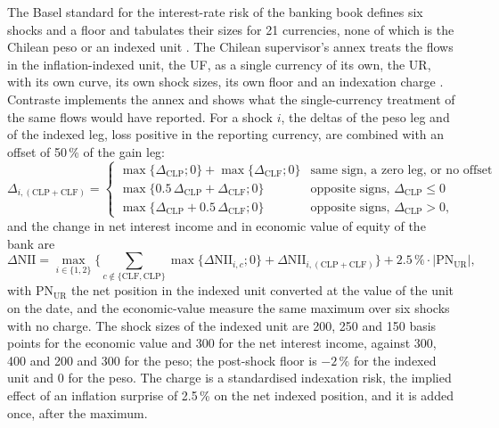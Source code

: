 The Basel standard for the interest-rate risk of the banking book defines six shocks and a floor and tabulates their sizes for 21 currencies, none of which is the
Chilean peso or an indexed unit \citep{proposed:bcbssrp31,alm:bcbs2016}. The Chilean supervisor's annex treats the flows in the inflation-indexed unit, the
UF, as a single currency of its own, the UR, with its own curve, its own shock sizes, its own floor and an indexation charge \citep{alm:cmf2025}. Contraste implements the annex
and shows what the single-currency treatment of the same flows would have reported. For a shock $i$, the deltas of the peso leg and of the indexed leg, loss positive in
the reporting currency, are combined with an offset of 50\,\% of the gain leg:
\begin{equation}
\Delta_{i,(\mathrm{CLP}+\mathrm{CLF})}=\begin{cases}\max\{\Delta_{\mathrm{CLP}};0\}+\max\{\Delta_{\mathrm{CLF}};0\} & \text{same sign, a zero leg, or no offset}\\
\max\{0.5\,\Delta_{\mathrm{CLP}}+\Delta_{\mathrm{CLF}};0\} & \text{opposite signs, }\Delta_{\mathrm{CLP}}\le 0\\
\max\{\Delta_{\mathrm{CLP}}+0.5\,\Delta_{\mathrm{CLF}};0\} & \text{opposite signs, }\Delta_{\mathrm{CLP}}>0,\end{cases}
\label{eq:bs7-pair}
\end{equation}
and the change in net interest income and in economic value of equity of the bank are
\begin{equation}
\Delta\mathrm{NII}=\max_{i\in\{1,2\}}\Big\{\sum_{c\notin\{\mathrm{CLF},\mathrm{CLP}\}}\max\{\Delta\mathrm{NII}_{i,c};0\}+\Delta\mathrm{NII}_{i,(\mathrm{CLP}+\mathrm{CLF})}\Big\}+2.5\,\%\cdot|\mathrm{PN}_{\mathrm{UR}}|,
\label{eq:bs7-nii}
\end{equation}
with $\mathrm{PN}_{\mathrm{UR}}$ the net position in the indexed unit converted at the value of the unit on the date, and the economic-value measure the same maximum over six
shocks with no charge. The shock sizes of the indexed unit are 200, 250 and 150 basis points for the economic value and 300 for the net interest income, against 300,
400 and 200 and 300 for the peso; the post-shock floor is $-2\,\%$ for the indexed unit and $0$ for the peso. The charge is a standardised indexation risk, the implied
effect of an inflation surprise of 2.5\,\% on the net indexed position, and it is added once, after the maximum.

